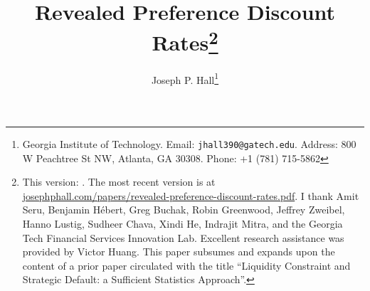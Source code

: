 \documentclass[12pt,english]{article}
\begin{document}
\begin{singlespace}
\title{\textbf{\large {Revealed Preference Discount Rates}\thanks{{\footnotesize{}This version: \versiondate. The most recent version is at \href{https://josephphall.com/papers/revealed-preference-discount-rates.pdf}{josephphall.com/papers/revealed-preference-discount-rates.pdf}. I thank Amit Seru, Benjamin H\'ebert, Greg Buchak, Robin Greenwood, Jeffrey Zweibel, Hanno Lustig, Sudheer Chava, Xindi He, Indrajit Mitra, and the Georgia Tech Financial Services Innovation Lab. Excellent research assistance was provided by Victor Huang. This paper subsumes and expands upon the content of a prior paper circulated with the title ``Liquidity Constraint and Strategic Default: a Sufficient Statistics Approach''.
}}
}}


\author{%
\normalsize Joseph P. Hall\thanks{%
   Georgia Institute of Technology. {Email: \tt jhall390@gatech.edu}. Address: 800 W Peachtree St NW, Atlanta, GA 30308. Phone: +1 (781) 715-5862 }
      }


\date{}
\maketitle

\centering


\end{singlespace}


\vspace{-0.25cm}
\end{document}
